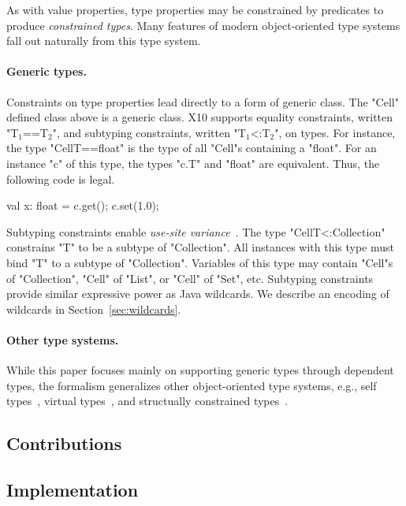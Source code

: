 \documentclass[preprint,nocopyrightspace,9pt]{sigplanconf}
\begin{document}
As with value properties, type properties may be constrained
by predicates to produce \emph{constrained types}.
Many features of modern object-oriented type systems fall out
naturally from this type system.

\paragraph{Generic types.}
Constraints on type properties lead directly to a form of generic class.
The \xcd"Cell" defined class above is a generic class.
X10 supports
equality constraints, written \xcdmath"T$_1$==T$_2$", and
subtyping constraints, written \xcdmath"T$_1$<:T$_2$", on types.
For instance,
the type \xcd"Cell{T==float}" is the type of all \xcd"Cell"s
containing a \xcd"float".  For an instance \xcd"c" of this type,
the types \xcd"c.T" and \xcd"float" are equivalent.  Thus, the
following code is legal.
\begin{xten}
val x: float = c.get();
c.set(1.0);
\end{xten}

Subtyping constraints enable \emph{use-site variance}~\cite{variance}.
The type \xcd"Cell{T<:Collection}"
constrains \xcd"T" to be a subtype of \xcd"Collection".
All instances with this type must bind \xcd"T" to a subtype of
\xcd"Collection".
Variables of this type may contain \xcd"Cell"s of
\xcd"Collection", \xcd"Cell" of \xcd"List",
or \xcd"Cell" of \xcd"Set", etc.
Subtyping constraints provide similar expressive power as Java
wildcards.  We describe an encoding of wildcards in
Section~\ref{sec:wildcards}. 

\paragraph{Other type systems.}

While this paper focuses mainly on supporting generic types 
through dependent types, the formalism generalizes 
other object-oriented type systems, e.g., self
types~\cite{bruce-binary,bsg95}, virtual
types~\cite{mp89-virtual-classes,beta,ernst06-virtual},
and structually constrained
types~\cite{polyj,haskell-type-classes}.

\subsection{Contributions}


\subsection{Implementation}
\end{document}
